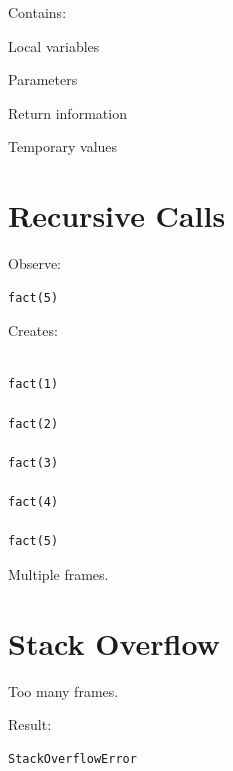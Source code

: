 \documentclass[11pt,a4paper]{book}
\begin{document}
Contains:


Local variables


Parameters


Return information


Temporary values


\section{Recursive Calls}

Observe:

\begin{verbatim} 
fact(5)
\end{verbatim}


Creates:

\begin{verbatim}

fact(1)

fact(2)

fact(3)

fact(4)

fact(5)

\end{verbatim}


Multiple frames.


\section{Stack Overflow}

Too many frames.


Result:

\begin{verbatim} 
StackOverflowError
\end{verbatim}
\end{document}

